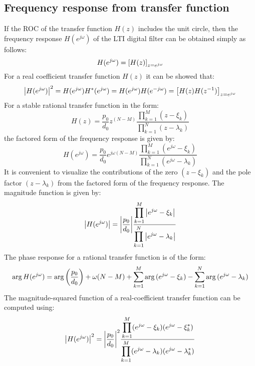 \documentclass[../../main/main.tex]{subfiles}
\begin{document}

\subsection{Frequency response from transfer function}
If the ROC of the transfer function \( H(z) \) includes the unit circle, then the frequency response \( H(e^{j\omega}) \) of the LTI digital filter can be obtained simply as follows:
\begin{equation}
    H(e^{j\omega})
    =
    \qty[H(z)]_{z=e^{j\omega}}
    \label{eq:L19_S03_1}
\end{equation}
For a real coefficient transfer function \( H(z) \) it can be showed that:
\begin{equation}
    \abs{H(e^{j\omega})}^2
    =
    H(e^{j\omega}) H^{*}(e^{j\omega})
    =
    H(e^{j\omega}) H(e^{-j\omega})
    =
    \qty[H(z)H(z^{-1})]_{z=e^{j\omega}}
    \label{eq:L19_S03_2}
\end{equation}
For a stable rational transfer function in the form:
\begin{equation}
    H(z)
    =
    \frac{p_{0}}{d_{0}} z^{(N-M)} \frac{\displaystyle \prod_{k=1}^{M} (z-\xi_{k})}{\displaystyle \prod_{k=1}^{N} (z-\lambda_{k})}
    \label{eq:L19_S04_1}
\end{equation}
the factored form of the frequency response is given by:
\begin{equation}
    H(e^{j\omega})
    =
    \frac{p_{0}}{d_{0}} e^{j\omega (N-M)} \frac{\displaystyle \prod_{k=1}^{M} (e^{j\omega}-\xi_{k})}{\displaystyle \prod_{k=1}^{N} (e^{j\omega}-\lambda_{k})}
    \label{eq:L19_S04_2}
\end{equation}
It is convenient to visualize the contributions of the zero \( (z-\xi_{k}) \) and the pole factor \( (z-\lambda_{k}) \) from the factored form of the frequency response. The magnitude function is given by:
\begin{equation}
    \abs{H(e^{j\omega})}
    =
    \abs{\frac{p_{0}}{d_{0}}}
    \frac{\displaystyle \prod_{k=1}^{M} \abs{e^{j\omega}-\xi_{k}}}{\displaystyle \prod_{k=1}^{N} \abs{e^{j\omega}-\lambda_{k}}}
    \label{eq:L19_S05_1}
\end{equation}
The phase response for a rational transfer function is of the form:
\begin{equation}
    \arg{H(e^{j\omega})}
    =
    \arg{\qty(\frac{p_{0}}{d_{0}})} + \omega (N-M) + \sum_{k=1}^{M} \arg{(e^{j\omega} - \xi_{k})} - \sum_{k=1}^{N} \arg{(e^{j\omega} - \lambda_{k})}
    \label{eq:L19_S06_1}
\end{equation}
The magnitude-squared function of a real-coefficient transfer function can be computed using:
\begin{equation}
    \abs{H(e^{j\omega})}^{2}
    =
    \abs{\frac{p_{0}}{d_{0}}}^{2}
    \frac{\displaystyle \prod_{k=1}^{M} (e^{j\omega}-\xi_{k})(e^{j\omega} - \xi^{*}_{k})}{\displaystyle \prod_{k=1}^{M} (e^{j\omega}-\lambda_{k})(e^{j\omega} - \lambda^{*}_{k})}
    \label{eq:L19_S07_1}
\end{equation}
\end{document}
